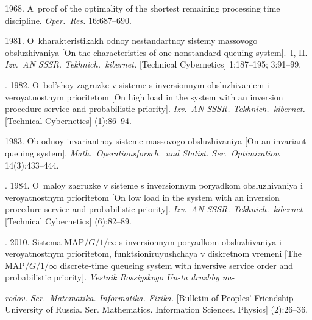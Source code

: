   \begin{multicols}{2}

\renewcommand{\bibname}{\protect\rmfamily References}

{\small\frenchspacing
 {%
 \begin{thebibliography}{99}


 1968.
A~proof of the optimality of
the shortest remaining processing time discipline.
\textit{Oper.\ Res.} 16:687--690.

 1981.
O~kharakteristikakh odnoy nestandartnoy sistemy
massovogo obsluzhivaniya
[On the characteristics of one nonstandard queuing
system].~I, II.
\textit{Izv.\ AN SSSR. Tekhnich.\ kibernet.}
[Technical Cybernetics] 1:187--195; 3:91--99.


. 1982.
O~bol'shoy zagruzke v sisteme s inversionnym
obsluzhivaniem i ve\-ro\-yat\-nostnym prioritetom
[On high load in the system with an inversion
procedure service and probabilistic priority].
\textit{Izv.\ AN SSSR. Tekhnich.\ kibernet.}
[Technical Cybernetics] (1):86--94.

 1983.
Ob odnoy invariantnoy sisteme massovogo
obsluzhivaniya [On an invariant queuing system].
\textit{Math.\ Operationsforsch.\ und Statist.
Ser.\ Optimization} 14(3):433--444.


. 1984.
O~ma\-loy zagruzke v sisteme s inversionnym poryadkom
obsluzhivaniya i veroyatnostnym prioritetom
[On low load in the system with an inversion
procedure service and probabilistic priority].
\textit{Izv.\ AN SSSR. Tekhnich.\ kibernet}
[{Technical Cybernetics}] (6):82--89.

. 2010.
Sistema MAP$/G/1/\infty$ s inversionnym poryadkom
obsluzhivaniya i veroyatnostnym prioritetom,
funktsioniruyushchaya v diskretnom vremeni
[The MAP$/G/1/\infty$ discrete-time queueing
system with inversive service order and probabilistic
priority].
\textit{Vestnik Rossiyskogo Un-ta druzh\-by
na-}\linebreak\vspace*{-12pt}

\pagebreak

\noindent
\textit{ro\-dov. Ser.\ Matematika. Informatika. Fizika.}
[Bulletin of Peoples' Friendship University
of Russia. Ser. Mathematics. Information Sciences.
Physics] (2):26--36.


\end{thebibliography}}}
\end{multicols}
